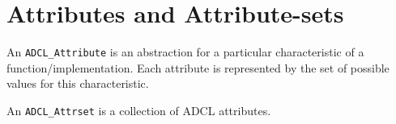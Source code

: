 \section{Attributes and Attribute-sets}

An {\tt ADCL\_Attribute} is an abstraction for a particular characteristic of a function/implementation. Each attribute is represented by the set of possible values for this characteristic.




An {\tt ADCL\_Attrset} is a collection of ADCL attributes.
